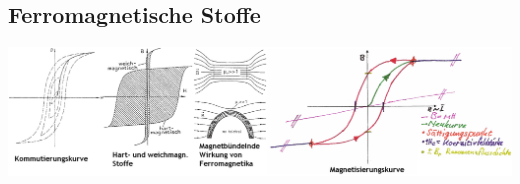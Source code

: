 \begin{landscape}
\subsection{Ferromagnetische Stoffe} \label{ferromagnetische_stoffe}
\includegraphics[width=25cm]{./pics/magnetisierung.png}


\end{landscape}